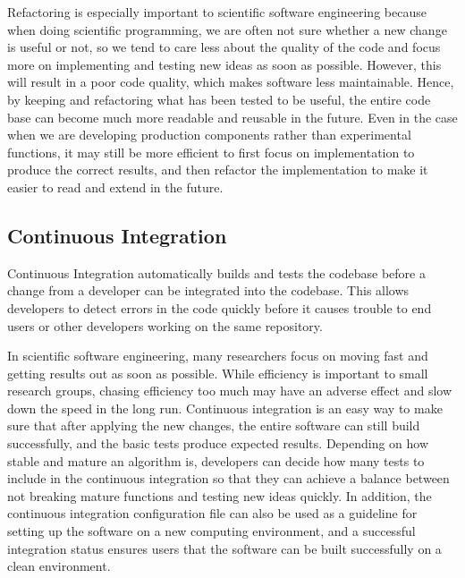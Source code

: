 Refactoring is especially important to scientific software engineering because when doing scientific programming, we are often not sure whether a new change is useful or not, 
so we tend to care less about the quality of the code and focus more on implementing and testing new ideas as soon as possible.
However, this will result in a poor code quality, which makes software less maintainable.
Hence, by keeping and refactoring what has been tested to be useful, the entire code base can become much more readable and reusable in the future.
Even in the case when we are developing production components rather than experimental functions, it may still be more efficient to first focus on implementation to produce the correct results, and then refactor the implementation to make it easier to read and extend in the future.

\subsection{Continuous Integration}
Continuous Integration automatically builds and tests the codebase before a change from a developer can be integrated into the codebase.
This allows developers to detect errors in the code quickly before it causes trouble to end users or other developers working on the same repository.

In scientific software engineering, many researchers focus on moving fast and getting results out as soon as possible.
While efficiency is important to small research groups, chasing efficiency too much may have an adverse effect and slow down the speed in the long run.
Continuous integration is an easy way to make sure that after applying the new changes, the entire software can still build successfully, and the basic tests produce expected results.
Depending on how stable and mature an algorithm is, developers can decide how many tests to include in the continuous integration so that they can achieve a balance between not breaking mature functions and testing new ideas quickly.
In addition, the continuous integration configuration file can also be used as a guideline for setting up the software on a new computing environment, and a successful integration status ensures users that the software can be built successfully on a clean environment.
